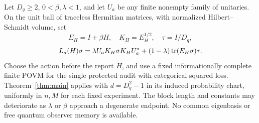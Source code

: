\begin{theorem}\label{thm:quantum}
Let $D_q\ge2$, $0<\beta,\lambda<1$, and let $U_a$ be any finite nonempty family of unitaries. On the unit ball of traceless Hermitian matrices, with normalized Hilbert--Schmidt volume, set
\[
 E_H=I+\beta H,\quad K_H=E_H^{1/2},\quad \tau=I/D_q,
\]
\begin{equation}\label{eq:quantum-instrument}
 L_a(H)\sigma=\lambda U_aK_H\sigma K_HU_a^*
          +(1-\lambda)\operatorname{tr}(E_H\sigma)\tau.
\end{equation}
Choose the action before the report $H$, and use a fixed informationally complete finite POVM for the single protected audit with categorical squared loss. Theorem~\ref{thm:main} applies with $d=D_q^2-1$ in its induced probability chart, uniformly in $n,M$ for each fixed experiment. The block length and constants may deteriorate as $\lambda$ or $\beta$ approach a degenerate endpoint. No common eigenbasis or free quantum observer memory is available.
\end{theorem}
